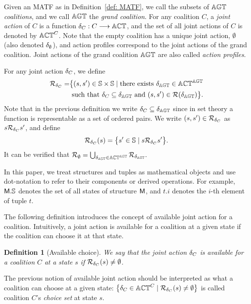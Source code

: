 \documentclass{article}
\newtheorem{definition}{Definition}
\begin{document}
Given an MATF as in Definition~\ref{def: MATF}, we call the subsets of $\mathbb{AGT}$ \emph{coalitions}, and we call $\mathbb{AGT}$ the \emph{grand coalition}. For any coalition $C$, a \emph{joint action} of $C$ is a function $\delta_{C} : C \longrightarrow \mathbb{ACT}$, and the set of all joint actions of $C$ is denoted by $\mathbb{ACT}^{C}$. Note that the empty coalition has a unique joint action, $\emptyset$ (also denoted $\delta_\emptyset$), and action profiles correspond to the joint actions of the grand coalition.
Joint actions of the grand
coalition $\mathbb{AGT}$ are also  called \emph{action profiles}.

For any joint action $\delta_{C}$, we define
\begin{align*}
\mathcal{R}_{\delta_{C}} =& \big\{ (s,s') \in \mathbb{S} \times \mathbb{S} \mid{} \text{there exists } \delta_{\mathbb{AGT}} \in \mathbb{ACT}^{\mathbb{AGT}} \\
&\text{ such that }
\delta_{C} \subseteq \delta_{\mathbb{AGT}} \text{ and } (s,s') \in \mathcal{R}(\delta_{\mathbb{AGT}})\big\}.
\end{align*}
Note that in the previous
definition 
we write
$\delta_{C} \subseteq \delta_{\mathbb{AGT}} $
since in set theory
a function is representable as a  set of ordered pairs. We write $(s,s') \in \mathcal{R}_{\delta_{C}}$ as $s \mathcal{R}_{\delta_{C}} s'$, and define
\begin{align*}
\mathcal{R}_{\delta_{C}}(s) = \big\{ s'\in \mathbb{S} \mid s \mathcal{R}_{\delta_{C}} s' \big\}.
\end{align*}
It can be verified that
$\mathcal{R}_{\emptyset} = \bigcup_{\delta_{\mathbb{AGT}} \in \mathbb{ACT}^{\mathbb{AGT}}} \mathcal{R}_{\delta_{\mathbb{AGT}}}.$

In this paper, we treat structures and tuples as mathematical objects and use dot-notation to refer to their components or derived operations.
 For example, $\mathsf{M}.\mathbb{S}$ denotes the set of all states of structure $\mathsf{M}$, and $t.i$ denotes the $i$-th element of tuple $t$. 

The following definition
introduces the concept
of available joint action for a coalition.
Intuitively, a joint action is available
for a coalition at a given state if the coalition 
can choose it at that state. 
\begin{definition}[Available choice]
We say that the  joint action $\delta_{C}$ is available for a coalition $C$ at a state $s$ if 
$
\mathcal{R}_{\delta_{C}}(s) \neq \emptyset$. 
\end{definition}
The previous notion of available joint action  should be interpreted as what a coalition can choose at a given state:  
$
\big\{ \delta_{C} \in \mathbb{ACT}^{C} \mid \mathcal{R}_{\delta_{C}}(s) \neq \emptyset \big\}$
is called coalition $C$'s \emph{choice set} at state $s$.
\end{document}
